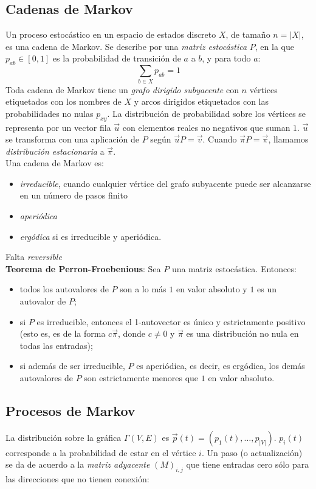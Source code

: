 \subsection{Cadenas de Markov}
Un proceso estocástico en un espacio de estados discreto $X$, de tamaño $n=|X|$, es una cadena de Markov. Se describe por una \textit{matriz estocástica} $P$, en la que $p_{ab}\in [0,1]$ es la probabilidad de transición de $a$ a $b$, y para todo $a$:
\begin{equation}
    \sum_{b\in X}p_{ab}=1
\end{equation}
Toda cadena de Markov tiene un \textit{grafo dirigido subyacente} con $n$ vértices etiquetados con los nombres de $X$ y arcos dirigidos etiquetados con las probabilidades no nulas $p_{xy}$. La distribución de probabilidad sobre los vértices se representa por un vector fila $\Vec{u}$ con elementos reales no negativos que suman $1$. $\vec{u}$ se transforma con una aplicación de $P$ según $\vec{u}P=\Vec{v}$. Cuando $\vec{\pi}P=\vec{\pi}$, llamamos \textit{distribución estacionaria} a $\vec{\pi}$.\\

\noindent Una cadena de Markov es:
\begin{itemize}
    \item \textit{irreducible}, cuando cualquier vértice del grafo subyacente puede ser alcanzarse en un número de pasos finito
    \item \textit{aperiódica} 
    \item \textit{ergódica} si es irreducible y aperiódica.
\end{itemize}
Falta \textit{reversible}\\
\textbf{Teorema de Perron-Froebenious}: Sea $P$ una matriz estocástica. Entonces:
\begin{itemize}
    \item todos los autovalores de $P$ son a lo más $1$ en valor absoluto y $1$ es un autovalor de $P$;
    \item si $P$ es irreducible, entonces el 1-autovector es único y estrictamente positivo (esto es, es de la forma $c\vec{\pi}$, donde $c\neq 0$ y $\vec{\pi}$ es una distribución no nula en todas las entradas);
    \item si además de ser irreducible, $P$ es aperiódica, es decir, es ergódica, los demás autovalores de $P$ son estrictamente menores que $1$ en valor absoluto.
\end{itemize}

\subsection{Procesos de Markov\label{ProcesosMarkov}}
La distribución sobre la gráfica $\Gamma(V,E)$ es $\Vec{p}(t)=(p_1(t),\dots,p_{|V|})$. $p_i(t)$ corresponde a la probabilidad de estar en el vértice $i$. Un paso (o actualización) se da de acuerdo a la \textit{matriz adyacente} $(M)_{i,j}$ que tiene entradas cero sólo para las direcciones que no tienen conexión:

